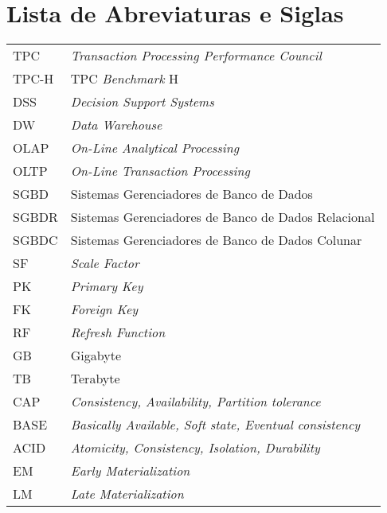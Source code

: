 
\pagebreak
{}
\listoffigures

\pagebreak
{}
\listoftables

\pagebreak
{}
\chapter*{Lista de Abreviaturas e Siglas}
\begin{tabular}{ll}
	TPC & \textit{Transaction Processing Performance Council}\\
	TPC-H & TPC \textit{Benchmark} H\\
	DSS & \textit{Decision Support Systems}\\
	DW & \textit{Data Warehouse}\\
	OLAP & \textit{On-Line Analytical Processing}\\
	OLTP & \textit{On-Line Transaction Processing}\\
	SGBD & Sistemas Gerenciadores de Banco de Dados\\
	SGBDR & Sistemas Gerenciadores de Banco de Dados Relacional\\
	SGBDC & Sistemas Gerenciadores de Banco de Dados Colunar \\
	SF & \textit{Scale Factor}\\
	PK & \textit{Primary Key}\\
	FK & \textit{Foreign Key}\\
	RF & \textit{Refresh Function} \\
	GB & Gigabyte \\
	TB & Terabyte \\
	CAP & \textit{Consistency, Availability, Partition tolerance} \\
	BASE & \textit{Basically Available, Soft state, Eventual consistency} \\
	ACID & \textit{Atomicity, Consistency, Isolation, Durability} \\
	EM & \textit{Early Materialization} \\
	LM & \textit{Late Materialization} \\
\end{tabular}

